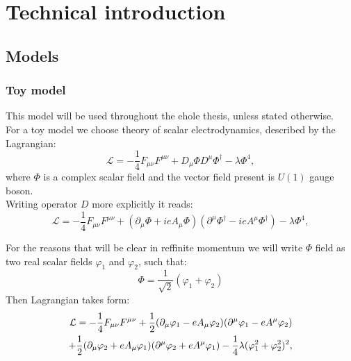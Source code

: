 \chapter{Technical introduction}
\section{Models}
\subsection{Toy model}
This model will be used throughout the ehole thesis, unless stated otherwise. \\
For a toy model we choose theory of scalar electrodynamics, described by the Lagrangian:
\begin{equation}
\mathcal{L} = -\frac{1}{4}F_{\mu\nu}F^{\mu\nu}+D_\mu\Phi D^\mu\Phi^\dag-\lambda\Phi^4,
\end{equation}
where $\Phi$ is a complex scalar field and the vector field present is $U(1)$ gauge boson. \\


Writing operator $D$ more explicitly it reads:
\begin{equation}
\mathcal{L} = -\frac{1}{4}F_{\mu\nu}F^{\mu\nu}+(\partial_\mu\Phi + ieA_\mu\Phi) 
(\partial^\mu\Phi^\dag-ieA^\mu\Phi^\dag)-\lambda\Phi^4,
\end{equation}

For the reasons that will be clear in ref{finite momentum} we will write $\Phi$ 
field as two real scalar fields 
$\varphi_1$ and $\varphi_2$, such that:
\begin{equation}
\Phi = \frac{1}{\sqrt{2}}(\varphi_1+\varphi_2)
\end{equation}
Then Lagrangian takes form:
\begin{align}
\mathcal{L} = -\frac{1}{4}F_{\mu\nu}F^{\mu\nu}+ \frac{1}{2}(\partial_\mu\varphi_1 - eA_\mu\varphi_2)
(\partial^\mu\varphi_1 - eA^\mu\varphi_2)  \\
+\frac{1}{2}(\partial_\mu\varphi_2+eA_\mu\varphi_1)(\partial^\mu\varphi_2+eA^\mu\varphi_1) 
-\frac{1}{4}\lambda(\varphi_1^2+\varphi_2^2)^2,\notag
\end{align}

